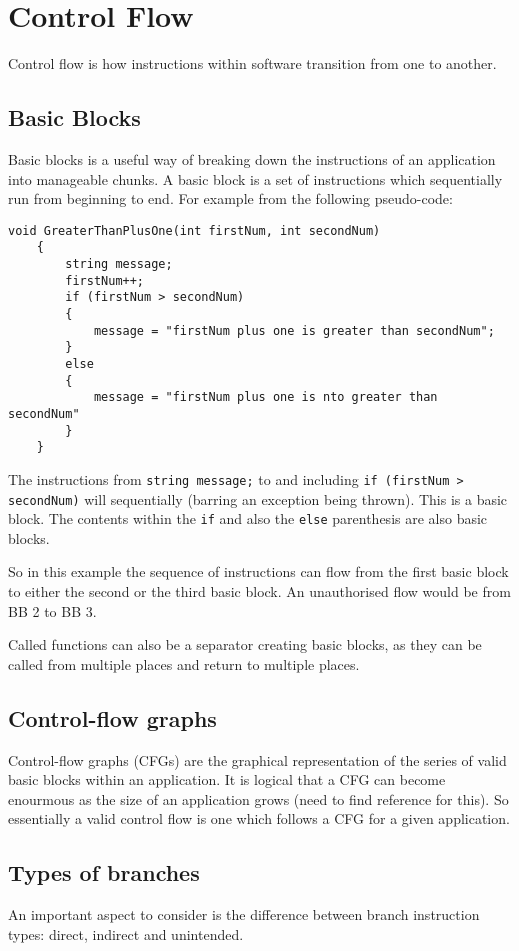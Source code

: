 \section{Control Flow}
Control flow is how instructions within software transition from one to another.

\subsection{Basic Blocks}
Basic blocks is a useful way of breaking down the instructions of an application into manageable chunks. A basic block is a set of instructions which sequentially run from beginning to end. For example from the following pseudo-code:

\begin{verbatim}
void GreaterThanPlusOne(int firstNum, int secondNum)
    {
        string message;
        firstNum++;
        if (firstNum > secondNum)
        {
            message = "firstNum plus one is greater than secondNum";
        }
        else
        {
            message = "firstNum plus one is nto greater than secondNum"
        }
    }
\end{verbatim}

The instructions from \verb|string message;| to and including \verb|if (firstNum > secondNum)| will sequentially (barring an exception being thrown). This is a basic block. The contents within the \verb|if| and also the \verb|else| parenthesis are also basic blocks.

So in this example the sequence of instructions can flow from the first basic block to either the second or the third basic block. An unauthorised flow would be from BB 2 to BB 3.

Called functions can also be a separator creating basic blocks, as they can be called from multiple places and return to multiple places.

\subsection{Control-flow graphs}
Control-flow graphs (CFGs) are the graphical representation of the series of valid basic blocks within an application. It is logical that a CFG can become enourmous as the size of an application grows (need to find reference for this). So essentially a valid control flow is one which follows a CFG for a given application.

\subsection{Types of branches}
An important aspect to consider is the difference between branch instruction types: direct, indirect and unintended.

